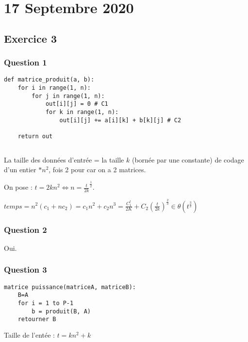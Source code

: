 \section{17 Septembre 2020}

\subsection{Exercice 3}

\subsubsection{Question 1}

\begin{verbatim}
def matrice_produit(a, b):
	for i in range(1, n):
		for j in range(1, n):
			out[i][j] = 0 # C1
			for k in range(1, n):
				out[i][j] += a[i][k] + b[k][j] # C2
	
	return out
			
\end{verbatim}

La taille des données d'entrée = la taille $k$ (bornée par une constante) de codage d'un entier $*n^2$, fois 2 pour car on a 2 matrices.

On pose : $t=2kn^2 \iff n=\frac{t}{2k}^\frac{1}{2}$.

	$temps = n^2(c_1+nc_2)=c_1n^2+c_2n^3=\frac{C_1^t}{2K}+C_2(\frac{t}{2k})^\frac{2}{3} \in \theta(t^\frac{3}{2})$

\subsubsection{Question 2}

Oui.

\subsubsection{Question 3}

\begin{verbatim}
matrice puissance(matriceA, matriceB):
	B=A
	for i = 1 to P-1
		b = produit(B, A)
	retourner B
\end{verbatim}

Taille de l'entée : $t=kn^2+k$

